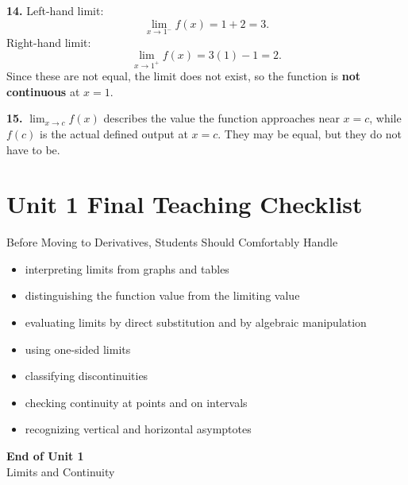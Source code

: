 \documentclass[11pt]{article}
\begin{document}
\bigskip

\textbf{14.}
Left-hand limit:
\[
\lim_{x\to 1^-}f(x)=1+2=3.
\]
Right-hand limit:
\[
\lim_{x\to 1^+}f(x)=3(1)-1=2.
\]
Since these are not equal, the limit does not exist, so the function is \textbf{not continuous} at $x=1$.

\bigskip

\textbf{15.}
$\lim_{x\to c}f(x)$ describes the value the function approaches near $x=c$, while $f(c)$ is the actual defined output at $x=c$. They may be equal, but they do not have to be.

\newpage
\section*{Unit 1 Final Teaching Checklist}

\begin{skillbox}{Before Moving to Derivatives, Students Should Comfortably Handle}
\begin{itemize}
    \item interpreting limits from graphs and tables
    \item distinguishing the function value from the limiting value
    \item evaluating limits by direct substitution and by algebraic manipulation
    \item using one-sided limits
    \item classifying discontinuities
    \item checking continuity at points and on intervals
    \item recognizing vertical and horizontal asymptotes
\end{itemize}
\end{skillbox}

\vfill

\begin{center}
{\Large\bfseries\color{novelPurpleDark} End of Unit 1}\\[0.5em]
{\large\color{novelPurple} Limits and Continuity}
\end{center}
\end{document}
